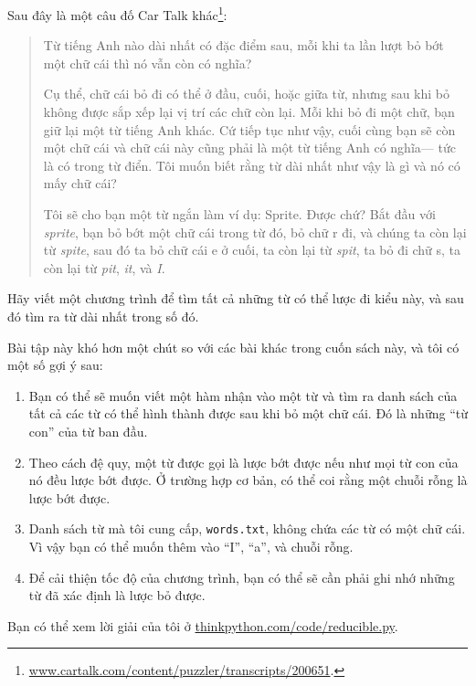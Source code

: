 \documentclass[11pt]{book}
\begin{document}
\begin{ex}


Sau đây là một câu đố Car Talk khác\footnote{
\url{www.cartalk.com/content/puzzler/transcripts/200651}.}:

\begin{quote}
Từ tiếng Anh nào dài nhất có đặc điểm sau, mỗi khi ta lần lượt bỏ bớt
một chữ cái thì nó vẫn còn có nghĩa?

Cụ thể, chữ cái bỏ đi có thể ở đầu, cuối, hoặc giữa từ, nhưng sau khi bỏ
không được sắp xếp lại vị trí các chữ còn lại. Mỗi khi bỏ đi một chữ,
bạn giữ lại một từ tiếng Anh khác. Cứ tiếp tục như vậy, cuối cùng bạn sẽ 
còn một chữ cái và chữ cái này cũng phải là một từ tiếng Anh có nghĩa---
tức là có trong từ điển. Tôi muốn biết rằng từ dài nhất như vậy là gì và
nó có mấy chữ cái?

Tôi sẽ cho bạn một từ ngắn làm ví dụ: Sprite. Được chứ? Bắt đầu với
\textit{sprite}, bạn bỏ bớt một chữ cái trong từ đó, bỏ chữ r đi, 
và chúng ta còn lại từ \textit{spite}, sau đó ta bỏ chữ cái e ở cuối,
ta còn lại từ \textit{spit}, ta bỏ đi chữ s, ta còn lại từ \textit{pit},
\textit{it}, và \textit{I}.
\end{quote}


Hãy viết một chương trình để tìm tất cả những từ có thể lược đi kiểu này,
và sau đó tìm ra từ dài nhất trong số đó.

Bài tập này khó hơn một chút so với các bài khác trong cuốn sách này, và
tôi có một số gợi ý sau:

\begin{enumerate}

\item Bạn có thể sẽ muốn viết một hàm nhận vào một từ và tìm ra danh sách
  của tất cả các từ có thể hình thành được sau khi bỏ một chữ cái. Đó là
  những ``từ con'' của từ ban đầu.


\item Theo cách đệ quy, một từ được gọi là lược bớt được nếu như mọi từ con
của nó đều lược bớt được. Ở trường hợp cơ bản, có thể coi rằng một
chuỗi rỗng là lược bớt được.

\item Danh sách từ mà tôi cung cấp, {\tt words.txt}, không
chứa các từ có một chữ cái. Vì vậy bạn có thể muốn thêm vào 
``I'', ``a'', và chuỗi rỗng.

\item Để cải thiện tốc độ của chương trình, bạn có thể sẽ cần phải
ghi nhớ những từ đã xác định là lược bỏ được.

\end{enumerate}

Bạn có thể xem lời giải của tôi ở \url{thinkpython.com/code/reducible.py}.

\end{ex}
\end{document}
